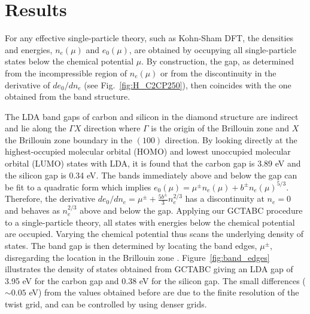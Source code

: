 \section{Results\label{sec:bg-results}}

For any effective single-particle theory, such as Kohn-Sham DFT,
the densities and energies, $n_e(\mu)$ and $e_0(\mu)$,
are obtained by occupying all single-particle states below the chemical potential $\mu$.
By construction, the gap, as determined from the incompressible region of $n_e(\mu)$ or from the discontinuity in the derivative of $de_0/dn_e$ (see Fig.~\ref{fig:H_C2CP250}), then coincides with the one obtained from the band structure.

The LDA band gaps of carbon and silicon in the diamond structure are indirect and lie along the $\Gamma X$ direction where $\Gamma$ is the origin of the Brillouin zone and
$X$ the Brillouin zone boundary in the $(100)$ direction. By looking directly at the highest-occupied molecular orbital (HOMO) and lowest unoccupied molecular orbital (LUMO) states with LDA, it is found that
the carbon gap is 3.89 eV %
and the silicon gap is  0.34 eV.
The bands immediately above and below the gap can be fit
to a quadratic form which implies $e_0(\mu) = \mu^{\pm} n_e(\mu) + b^\pm n_e(\mu)^{5/3}$. Therefore, the derivative $de_0/dn_e = \mu^{\pm} + \frac{5b^{\pm}}{3} n_e^{2/3}$ has a discontinuity at $n_e=0$ and behaves as $ n_e^{2/3}$ above and below the gap. 
Applying our GCTABC procedure to a single-particle theory,
all states with energies below the chemical potential are occupied. Varying the chemical potential
thus scans the underlying density of states. The band gap is then determined by locating the band
edges, $\mu^\pm$, disregarding the location in the Brillouin zone \cite{BrillouinFootnote}.
Figure~\ref{fig:band_edges} illustrates the density of states
obtained from GCTABC giving an LDA gap of 3.95 eV for the carbon gap
and 0.38 eV for the silicon gap. %
The small differences ($\sim 0.05$ eV) from the values obtained before are due to the finite
resolution of the twist grid, and can be controlled by using denser grids.

